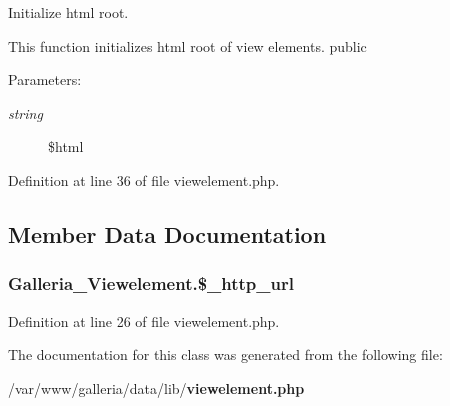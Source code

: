 Initialize html root.

This function initializes html root of view elements.  public

\begin{Desc}
\item[Parameters:]
\begin{description}
\item[{\em string}]\$html \end{description}
\end{Desc}


Definition at line 36 of file viewelement.php.

\subsection{Member Data Documentation}
\subsubsection{\setlength{\rightskip}{0pt plus 5cm}Galleria\_\-Viewelement.\$\_\-http\_\-url\hspace{0.3cm}{\tt  [static, protected]}}\label{classGalleria__Viewelement_11f2dd77002d08430fa1569ca66adc7c}




Definition at line 26 of file viewelement.php.

The documentation for this class was generated from the following file:\begin{CompactItemize}
\item 
/var/www/galleria/data/lib/{\bf viewelement.php}\end{CompactItemize}
